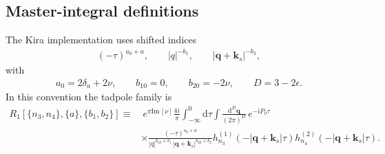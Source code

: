 \documentclass[a4paper,12pt]{article}
\newcommand{\FR}[2]{\displaystyle\frac{\,{#1}\,}{#2}}
\def\di{{\mathrm{d}}}
\def\mb{\mathbf}
\def\ii{\mathrm{i}}
\def\ep{\epsilon}
\def\Im{\mathrm{Im}\,}
\begin{document}
\subsection{Master-integral definitions}
The Kira implementation uses shifted indices
\begin{align}
	(-\tau)^{a_0+a},\qquad |q|^{-b_1},\qquad |\bm q+\bm k_s|^{-b_2},
\end{align}
with
\begin{align}
	a_0=2\delta_a+2\nu,\qquad b_{10}=0,\qquad b_{20}=-2\nu,\qquad D=3-2\ep.
\end{align}
In this convention the tadpole family is
\begin{align}
	R_1[\{n_3,n_4\},\{a\},\{b_1,b_2\}] \equiv &~e^{\pi \Im [\nu]}\frac{4i}{\pi}\int_{-\infty}^0 \di\tau \int \FR{\di^D \mb q}{(2\pi)^D}\, e^{-\ii P_0\tau}\nonumber\\
	&\times
	\frac{(-\tau)^{a_0+a}}{|q|^{b_{10}+b_1}\,|\bm q+\bm k_s|^{b_{20}+b_2}}
	h_{n_3}^{(1)}(-|\bm q+\bm k_s|\tau)h_{n_4}^{(2)}(-|\bm q+\bm k_s|\tau).
\end{align}


\end{document}
